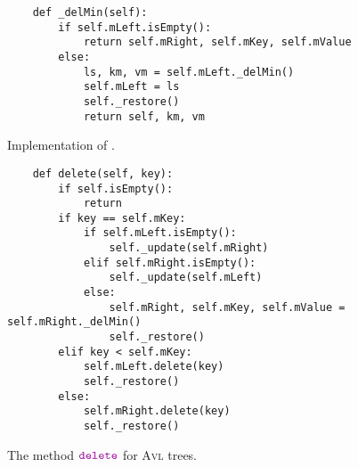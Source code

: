 \begin{figure}[!ht]
\centering
\begin{verbatim}
    def _delMin(self):
        if self.mLeft.isEmpty():
            return self.mRight, self.mKey, self.mValue
        else:
            ls, km, vm = self.mLeft._delMin()
            self.mLeft = ls
            self._restore()
            return self, km, vm
\end{verbatim}
\vspace*{-0.3cm}
\caption{Implementation of .}
\label{fig:avl-tree.ipython:delMin}
\end{figure}


\begin{figure}[!ht]
\centering
\begin{verbatim}
    def delete(self, key):
        if self.isEmpty():
            return
        if key == self.mKey:
            if self.mLeft.isEmpty():
                self._update(self.mRight)
            elif self.mRight.isEmpty():
                self._update(self.mLeft)
            else:
                self.mRight, self.mKey, self.mValue = self.mRight._delMin()
                self._restore()
        elif key < self.mKey:
            self.mLeft.delete(key)
            self._restore()
        else:
            self.mRight.delete(key)
            self._restore() 
\end{verbatim}
\vspace*{-0.3cm}
\caption{The method $\mytt{delete}$ for \textsc{Avl} trees.}
\label{fig:avl-tree.ipython:delete}
\end{figure}


